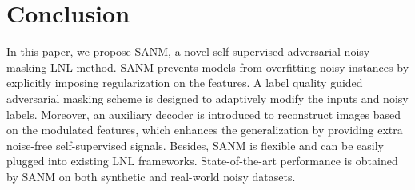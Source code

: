 \documentclass[10pt,twocolumn,letterpaper]{article}
\begin{document}
\iffalse
\textbf{Quantitative Results.} To further verify the regularization effect of SANM on the activation map, we visualize the activation maps of DivideMix and SANM (DivideMix) for both correctly and incorrectly labeled samples. As shown in Fig.~\ref{fig:ablation_activation}, for DivideMix, due to the influence of noisy samples, the activation maps of correctly labeled samples are focused on specific areas of the target instead of covering the whole object, while the results of mislabeled ones pay more attention to the meaningless background area, resulting in poor representation quality. By contrast, the results of SANM (DivideMix) cover the central regions of the objects for both samples and more information can be {covered} in our features, {even for the samples that are not object-centric (see Fig.~\ref{fig:ablation_noncenter}),} 
{indicating} that SANM can alleviate confirmation bias and prevent models from over-fitting to noisy labels by imposing explicit regularization on the peak locations. 
\fi

\vspace{-2mm}
\section{Conclusion}
\vspace{-2mm}
In this paper, we propose SANM, a novel self-supervised adversarial noisy masking LNL method. SANM prevents models from overfitting noisy instances by explicitly imposing regularization on the features. A label quality guided adversarial masking scheme is designed to adaptively modify the inputs and noisy labels. Moreover, an auxiliary decoder is introduced to reconstruct images based on the modulated features, which enhances the generalization by providing extra noise-free self-supervised signals. Besides, SANM is flexible and can be easily plugged into existing LNL frameworks. State-of-the-art performance is obtained by SANM on both synthetic and real-world noisy datasets.   



\medskip


{\small


}
\end{document}
